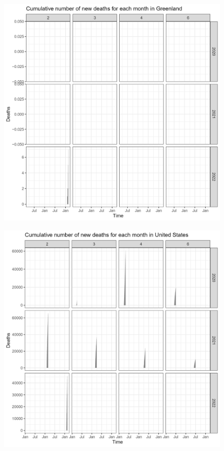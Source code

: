 \documentclass[a4paper]{article}
\theoremstyle{definition}
\begin{document}
\begin{enumerate}[i)]
\begin{enumerate}[1)]
\begin{figure}[H]
			\end{figure}
			\begin{figure}[H]
				\centering
				\includegraphics[scale=0.25]{images/6.8.2.png}
			\end{figure}
			\begin{figure}[H]
				\centering
				\includegraphics[scale=0.25]{images/6.8.3.png}

\end{figure}
\end{enumerate}
\end{enumerate}
\end{document}
